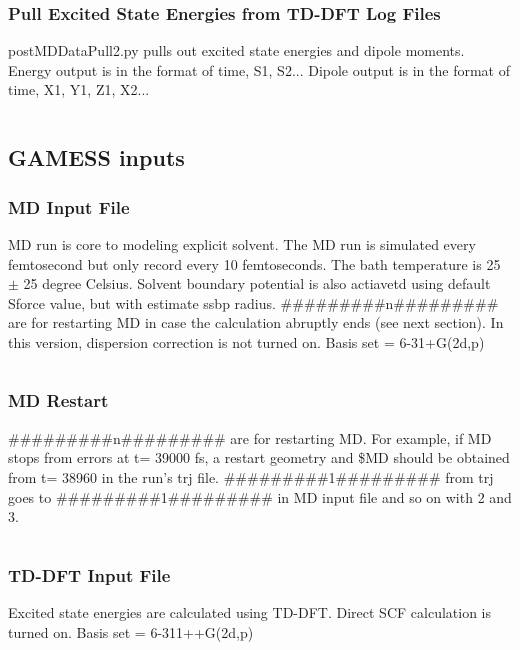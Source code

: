 \documentclass[
journal=jpcbfk, %
manuscript=article]{achemso}
\begin{document}
		\subsubsection{Pull Excited State Energies from TD-DFT Log Files}
			postMDDataPull2.py pulls out excited state energies and dipole moments. Energy output is in the format of time, S1, S2... Dipole output is in the format of time, X1, Y1, Z1, X2...
			\inputminted[linenos, breaklines, baselinestretch=1, fontsize=\small]{python}{../pythonScripts/postMDDataPull2.py} 
		
	\subsection{GAMESS inputs}
		\subsubsection{MD Input File}
			 MD run is core to modeling explicit solvent. The MD run is simulated every femtosecond but only record every 10 femtoseconds. The bath temperature is 25 $\pm$ 25 degree Celsius. Solvent boundary potential is also actiavetd using default Sforce value, but with estimate ssbp radius. \#\#\#\#\#\#\#\#\#n\#\#\#\#\#\#\#\#\# are for restarting MD in case the calculation abruptly ends (see next section). In this version, dispersion correction is not turned on. Basis set = 6-31+G(2d,p)
			 \inputminted[linenos, breaklines, baselinestretch=1, fontsize=\small]{Perl}{../GAMESSinpSample/MD_aniline32.inp}
			 
		\subsubsection{MD Restart}
		\#\#\#\#\#\#\#\#\#n\#\#\#\#\#\#\#\#\# are for restarting MD. For example, if MD stops from errors at t= 39000 fs, a restart geometry and \$MD should be obtained from t= 38960 in the run's trj file. \#\#\#\#\#\#\#\#\#1\#\#\#\#\#\#\#\#\# from trj goes to \#\#\#\#\#\#\#\#\#1\#\#\#\#\#\#\#\#\# in MD input file and so on with 2 and 3.
		\inputminted[linenos, breaklines, baselinestretch=1, fontsize=\small]{Perl}{../GAMESSinpSample/MD_aniline32.trj}
		
		\subsubsection{TD-DFT Input File}
			Excited state energies are calculated using TD-DFT. Direct SCF calculation is turned on. Basis set = 6-311++G(2d,p)
			\inputminted[linenos, breaklines, baselinestretch=1, fontsize=\small]{Perl}{../GAMESSinpSample/TDDFT_aniline32_15010.inp}
\end{document}
